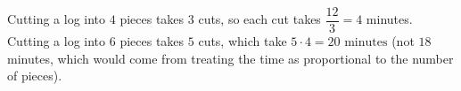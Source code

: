 Cutting a log into $4$ pieces takes $3$ cuts, so each cut takes $\dfrac{12}{3}=4$ minutes. Cutting a log into $6$ pieces takes $5$ cuts, which take $5\cdot4=\boxed{20\text{ minutes}}$ (not $18$ minutes, which would come from treating the time as proportional to the number of pieces).
